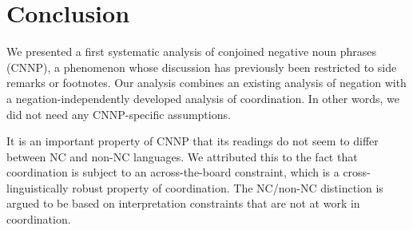 \documentclass[output=paper]{langsci/langscibook}
\begin{document}









\section{Conclusion}
\label{Sec-Conclusion}

\begin{sloppypar}
  We presented a first systematic analysis of conjoined negative noun
  phrases (CNNP), a phenomenon whose discussion has previously been
  restricted to side remarks or footnotes.  Our analysis combines an
  existing analysis of negation with a negation-independently
  developed analysis of coordination.  In other words, we did not need
  any CNNP-specific assumptions.
\end{sloppypar}
It is an important property of CNNP that its readings do not seem to differ between NC and non-NC languages.
We attributed this to the fact that coordination is subject to an across-the-board constraint, which is a cross-linguistically robust property of coordination. 
The NC/non-NC distinction is argued to be based on interpretation constraints that are not at work in coordination.



\end{document}
